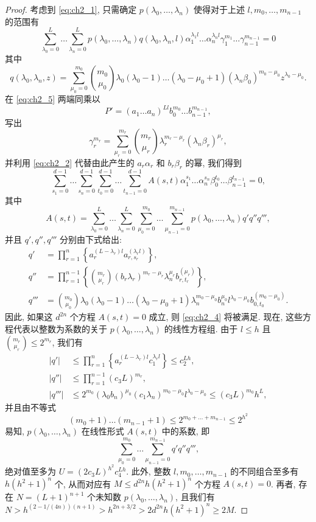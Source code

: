 \begin{proof}
考虑到 \eqref{eq:ch2_1}, 只需确定 $p(\lambda_0, \dots, \lambda_n)$ 使得对于上述 $l, m_0, \dots, m_{n-1}$ 的范围有
\begin{equation} \label{eq:ch2_5}\tag{5}
\sum_{\lambda_0=0}^L \dots \sum_{\lambda_n=0}^L p(\lambda_0, \dots, \lambda_n) q(\lambda_0, \lambda_n, l) \alpha_1^{\lambda_1 l} \dots \alpha_n^{\lambda_n l} \gamma_1^{m_1} \dots \gamma_{n-1}^{m_{n-1}} = 0
\end{equation}
其中
\[
q(\lambda_0, \lambda_n, z) = \sum_{\mu_0=0}^{m_0} \binom{m_0}{\mu_0} \lambda_0(\lambda_0 - 1) \dots (\lambda_0 - \mu_0 + 1) (\lambda_n \beta_0)^{m_0 - \mu_0} z^{\lambda_0 - \mu_0}.
\]
在 \eqref{eq:ch2_5} 两端同乘以
\begin{equation} \label{eq:ch2_6}\tag{6}
P' = (a_1 \dots a_n)^{Ll} b_0^{m_0} \dots b_{n-1}^{m_{n-1}},
\end{equation}
写出
\[
\gamma_r^{m_r} = \sum_{\mu_r=0}^{m_r} \binom{m_r}{\mu_r} \lambda_r^{m_r-\mu_r} (\lambda_n \beta_r)^{\mu_r},
\]
并利用 \eqref{eq:ch2_2} 代替由此产生的 $a_r \alpha_r$ 和 $b_r \beta_r$ 的幂, 我们得到
\[
\sum_{s_1=0}^{d-1} \dots \sum_{s_n=0}^{d-1} \sum_{t_0=0}^{d-1} \dots \sum_{t_{n-1}=0}^{d-1} A(s,t) \alpha_1^{s_1} \dots \alpha_n^{s_n} \beta_0^{t_0} \dots \beta_{n-1}^{t_{n-1}} = 0,
\]
其中
\[
A(s,t) = \sum_{\lambda_0=0}^L \dots \sum_{\lambda_n=0}^L \sum_{\mu_0=0}^{m_0} \dots \sum_{\mu_{n-1}=0}^{m_{n-1}} p(\lambda_0, \dots, \lambda_n) q' q'' q''',
\]
并且 $q', q'', q'''$ 分别由下式给出:
\begin{align*}
q' &= \prod_{r=1}^n \left\{ a_r^{(L-\lambda_r)l} a_{r,s_r}^{(\lambda_r l)} \right\}, \\
q'' &= \prod_{r=1}^{n-1} \left\{ \binom{m_r}{\mu_r} (b_r \lambda_r)^{m_r-\mu_r} \lambda_n^{\mu_r} b_{r,t_r}^{(\mu_r)} \right\}, \\
q''' &= \binom{m_0}{\mu_0} \lambda_0(\lambda_0-1) \dots (\lambda_0-\mu_0+1) \lambda_n^{m_0-\mu_0} b_n^{\mu_0} l^{\lambda_0-\mu_0} b_{0,t_0}^{(m_0-\mu_0)}.
\end{align*}
因此, 如果这 $d^{2n}$ 个方程 $A(s,t)=0$ 成立, 则 \eqref{eq:ch2_4} 将被满足. 现在, 这些方程代表以整数为系数的关于 $p(\lambda_0, \dots, \lambda_n)$ 的线性方程组.
由于 $l \le h$ 且 $\binom{m_r}{\mu_r} \le 2^{m_r}$, 我们有
\begin{align*}
|q'| &\le \prod_{r=1}^n \left\{ a_r^{(L-\lambda_r)l} c_1^{\lambda_r l} \right\} \le c_2^{Lh}, \\
|q''| &\le \prod_{r=1}^{n-1} (c_3 L)^{m_r}, \\
|q'''| &\le 2^{m_0} (\lambda_0 b_n)^{\mu_0} (c_1 \lambda_n)^{m_0 - \mu_0} l^{\lambda_0 - \mu_0} \le (c_3 L)^{m_0} h^L,
\end{align*}
并且由不等式
\[
(m_0+1)\dots(m_{n-1}+1) \le 2^{m_0+\dots+m_{n-1}} \le 2^{h^2}
\]
易知, $p(\lambda_0, \dots, \lambda_n)$ 在线性形式 $A(s,t)$ 中的系数, 即
\[
\sum_{\mu_0=0}^{m_0} \dots \sum_{\mu_{n-1}=0}^{m_{n-1}} q' q'' q''',
\]
绝对值至多为 $U = (2c_3 L)^{h^2} c_4^{Lh}$. 此外, 整数 $l, m_0, \dots, m_{n-1}$ 的不同组合至多有 $h(h^2+1)^n$ 个, 从而对应有 $M \le d^{2n} h(h^2+1)^n$ 个方程 $A(s,t)=0$. 再者, 存在 $N=(L+1)^{n+1}$ 个未知数 $p(\lambda_0, \dots, \lambda_n)$, 且我们有 $N > h^{(2-1/(4n))(n+1)} > h^{2n+3/2} > 2d^{2n} h(h^2+1)^n \ge 2M$.


\end{proof}
